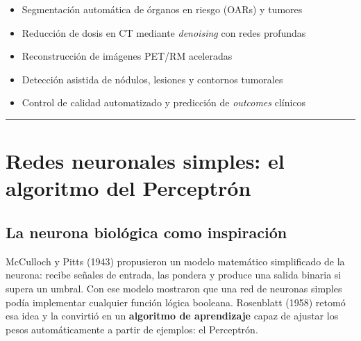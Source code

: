 \documentclass[
  letterpaper,
  DIV=11,
  numbers=noendperiod]{scrartcl}
\providecommand{\tightlist}{%
  \setlength{\itemsep}{0pt}\setlength{\parskip}{0pt}}
\begin{document}
\begin{tcolorbox}[enhanced jigsaw, arc=.35mm, bottomrule=.15mm, bottomtitle=1mm, breakable, colback=white, colbacktitle=quarto-callout-tip-color!10!white, colframe=quarto-callout-tip-color-frame, coltitle=black, left=2mm, leftrule=.75mm, opacityback=0, opacitybacktitle=0.6, rightrule=.15mm, title=\textcolor{quarto-callout-tip-color}{\faLightbulb}\hspace{0.5em}{Aplicaciones actuales en Física Médica}, titlerule=0mm, toprule=.15mm, toptitle=1mm]

\begin{itemize}
\tightlist
\item
  Segmentación automática de órganos en riesgo (OARs) y tumores
\item
  Reducción de dosis en CT mediante \emph{denoising} con redes profundas
\item
  Reconstrucción de imágenes PET/RM aceleradas
\item
  Detección asistida de nódulos, lesiones y contornos tumorales
\item
  Control de calidad automatizado y predicción de \emph{outcomes}
  clínicos
\end{itemize}

\end{tcolorbox}

\begin{center}\rule{0.5\linewidth}{0.5pt}\end{center}

\section{Redes neuronales simples: el algoritmo del
Perceptrón}\label{redes-neuronales-simples-el-algoritmo-del-perceptruxf3n}

\subsection{La neurona biológica como
inspiración}\label{la-neurona-bioluxf3gica-como-inspiraciuxf3n}

McCulloch y Pitts (1943) propusieron un modelo matemático simplificado
de la neurona: recibe señales de entrada, las pondera y produce una
salida binaria si supera un umbral. Con ese modelo mostraron que una red
de neuronas simples podía implementar cualquier función lógica booleana.
Rosenblatt (1958) retomó esa idea y la convirtió en un \textbf{algoritmo
de aprendizaje} capaz de ajustar los pesos automáticamente a partir de
ejemplos: el Perceptrón.
\end{document}
